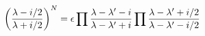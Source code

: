 \begin{equation}
\left({\lambda-i/2\over\lambda+i/2}\right)^N=\epsilon\prod
{\lambda-\lambda'-i\over \lambda-\lambda'+i}\prod
{\lambda-\lambda'+i/2\over \lambda-\lambda'-i/2}\label{bethe}
\end{equation}

